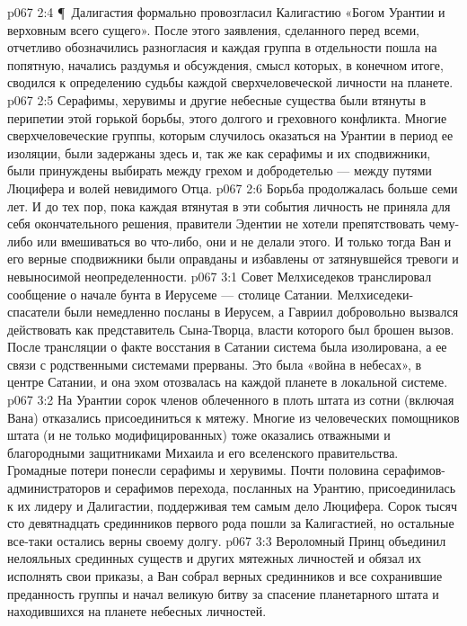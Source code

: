 \vs p067 2:4 \P\ Далигастия формально провозгласил Калигастию «Богом Урантии и верховным всего сущего». После этого заявления, сделанного перед всеми, отчетливо обозначились разногласия и каждая группа в отдельности пошла на попятную, начались раздумья и обсуждения, смысл которых, в конечном итоге, сводился к определению судьбы каждой сверхчеловеческой личности на планете.
\vs p067 2:5 Серафимы, херувимы и другие небесные существа были втянуты в перипетии этой горькой борьбы, этого долгого и греховного конфликта. Многие сверхчеловеческие группы, которым случилось оказаться на Урантии в период ее изоляции, были задержаны здесь и, так же как серафимы и их сподвижники, были принуждены выбирать между грехом и добродетелью --- между путями Люцифера и волей невидимого Отца.
\vs p067 2:6 Борьба продолжалась больше семи лет. И до тех пор, пока каждая втянутая в эти события личность не приняла для себя окончательного решения, правители Эдентии не хотели препятствовать чему\hyp{}либо или вмешиваться во что\hyp{}либо, они и не делали этого. И только тогда Ван и его верные сподвижники были оправданы и избавлены от затянувшейся тревоги и невыносимой неопределенности.
\vs p067 3:1 Совет Мелхиседеков транслировал сообщение о начале бунта в Иерусеме --- столице Сатании. Мелхиседеки\hyp{}спасатели были немедленно посланы в Иерусем, а Гавриил добровольно вызвался действовать как представитель Сына\hyp{}Творца, власти которого был брошен вызов. После трансляции о факте восстания в Сатании система была изолирована, а ее связи с родственными системами прерваны. Это была «война в небесах», в центре Сатании, и она эхом отозвалась на каждой планете в локальной системе.
\vs p067 3:2 На Урантии сорок членов облеченного в плоть штата из сотни (включая Вана) отказались присоединиться к мятежу. Многие из человеческих помощников штата (и не только модифицированных) тоже оказались отважными и благородными защитниками Михаила и его вселенского правительства. Громадные потери понесли серафимы и херувимы. Почти половина серафимов\hyp{}администраторов и серафимов перехода, посланных на Урантию, присоединилась к их лидеру и Далигастии, поддерживая тем самым дело Люцифера. Сорок тысяч сто девятнадцать срединников первого рода пошли за Калигастией, но остальные все\hyp{}таки остались верны своему долгу.
\vs p067 3:3 Вероломный Принц объединил нелояльных срединных существ и других мятежных личностей и обязал их исполнять свои приказы, а Ван собрал верных срединников и все сохранившие преданность группы и начал великую битву за спасение планетарного штата и находившихся на планете небесных личностей.
